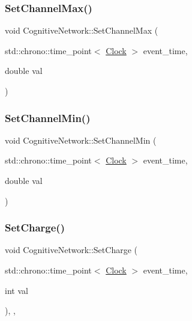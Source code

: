 \mbox{\label{classCognitiveNetwork_a9c208d66ee284adfceb3b2dd76532a00}} 
\subsubsection{\texorpdfstring{Set\+Channel\+Max()}{SetChannelMax()}}
{\footnotesize\ttfamily void Cognitive\+Network\+::\+Set\+Channel\+Max (\begin{DoxyParamCaption}\item[{std\+::chrono\+::time\+\_\+point$<$ \mbox{\hyperlink{universe_8h_a0ef8d951d1ca5ab3cfaf7ab4c7a6fd80}{Clock}} $>$}]{event\+\_\+time,  }\item[{double}]{val }\end{DoxyParamCaption})\hspace{0.3cm}{\ttfamily [inline]}}

\mbox{\label{classCognitiveNetwork_a6e2a6ced4ede9a4eef721d6c5aac433c}} 
\subsubsection{\texorpdfstring{Set\+Channel\+Min()}{SetChannelMin()}}
{\footnotesize\ttfamily void Cognitive\+Network\+::\+Set\+Channel\+Min (\begin{DoxyParamCaption}\item[{std\+::chrono\+::time\+\_\+point$<$ \mbox{\hyperlink{universe_8h_a0ef8d951d1ca5ab3cfaf7ab4c7a6fd80}{Clock}} $>$}]{event\+\_\+time,  }\item[{double}]{val }\end{DoxyParamCaption})\hspace{0.3cm}{\ttfamily [inline]}}

\mbox{\label{classCognitiveNetwork_a99f801aeca299186cc706696696749b1}} 
\subsubsection{\texorpdfstring{Set\+Charge()}{SetCharge()}}
{\footnotesize\ttfamily void Cognitive\+Network\+::\+Set\+Charge (\begin{DoxyParamCaption}\item[{std\+::chrono\+::time\+\_\+point$<$ \mbox{\hyperlink{universe_8h_a0ef8d951d1ca5ab3cfaf7ab4c7a6fd80}{Clock}} $>$}]{event\+\_\+time,  }\item[{int}]{val }\end{DoxyParamCaption})\hspace{0.3cm}{\ttfamily [inline]}, {\ttfamily [final]}, {\ttfamily [virtual]}}



